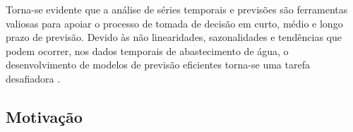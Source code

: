 Torna-se evidente que a análise de séries temporais e previsões são ferramentas valiosas para apoiar o processo de tomada de decisão em curto, médio e longo prazo de previsão. Devido às não linearidades, sazonalidades e tendências que podem ocorrer, nos dados temporais de abastecimento de água, o desenvolvimento de modelos de previsão eficientes torna-se uma tarefa desafiadora \cite{mateus}.


	


%

\subsection{Motiva\c c\~ao} 
\label{subsubsec:motivacao}

